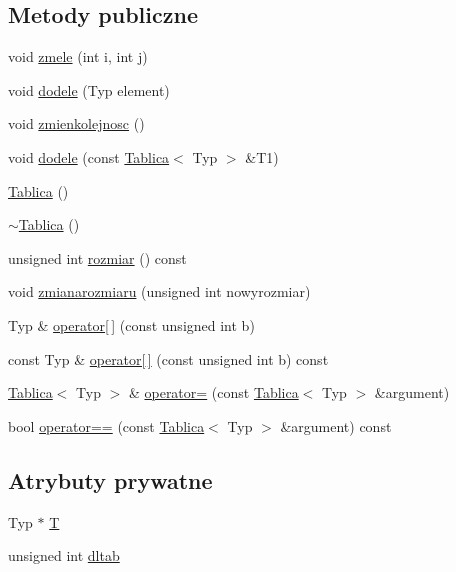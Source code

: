 \subsection*{\-Metody publiczne}
\begin{DoxyCompactItemize}
\item 
void \hyperlink{class_tablica_a335a030d40c416a7eaf1bf4d990cbf0b}{zmele} (int i, int j)
\item 
void \hyperlink{class_tablica_a36ea5cb0bb790766201f80acea48e845}{dodele} (\-Typ element)
\item 
void \hyperlink{class_tablica_a9a05fd018eb2142dd06760105efe96e8}{zmienkolejnosc} ()
\item 
void \hyperlink{class_tablica_a45f0caea929a920c29d829ada6137c79}{dodele} (const \hyperlink{class_tablica}{\-Tablica}$<$ \-Typ $>$ \&\-T1)
\item 
\hyperlink{class_tablica_a7d54bbcaa7963c50ee57e69f700b6cfc}{\-Tablica} ()
\item 
\hyperlink{class_tablica_aea2479778376598550fe82ec459a24ba}{$\sim$\-Tablica} ()
\item 
unsigned int \hyperlink{class_tablica_acf3f8d852711619ed205e1569f40f789}{rozmiar} () const 
\item 
void \hyperlink{class_tablica_aafcf1f86b79c0146fa313bae711cc97e}{zmianarozmiaru} (unsigned int nowyrozmiar)
\item 
\-Typ \& \hyperlink{class_tablica_a87f292495232b4f959291a3bc87bb829}{operator\mbox{[}$\,$\mbox{]}} (const unsigned int b)
\item 
const \-Typ \& \hyperlink{class_tablica_a5d41b52977f5bc0a3abf9e62cc209cc4}{operator\mbox{[}$\,$\mbox{]}} (const unsigned int b) const 
\item 
\hyperlink{class_tablica}{\-Tablica}$<$ \-Typ $>$ \& \hyperlink{class_tablica_a3626fbc8c7e54b24e7fba96b86a4173f}{operator=} (const \hyperlink{class_tablica}{\-Tablica}$<$ \-Typ $>$ \&argument)
\item 
bool \hyperlink{class_tablica_a5feb149bbeae655c6d7bafada90f9615}{operator==} (const \hyperlink{class_tablica}{\-Tablica}$<$ \-Typ $>$ \&argument) const 
\end{DoxyCompactItemize}
\subsection*{\-Atrybuty prywatne}
\begin{DoxyCompactItemize}
\item 
\-Typ $\ast$ \hyperlink{class_tablica_a8a186bd43f434e2c8b58377f6a54ab47}{\-T}
\item 
unsigned int \hyperlink{class_tablica_a1d87d674a1061ce4ca064d99f8714458}{dltab}
\end{DoxyCompactItemize}


